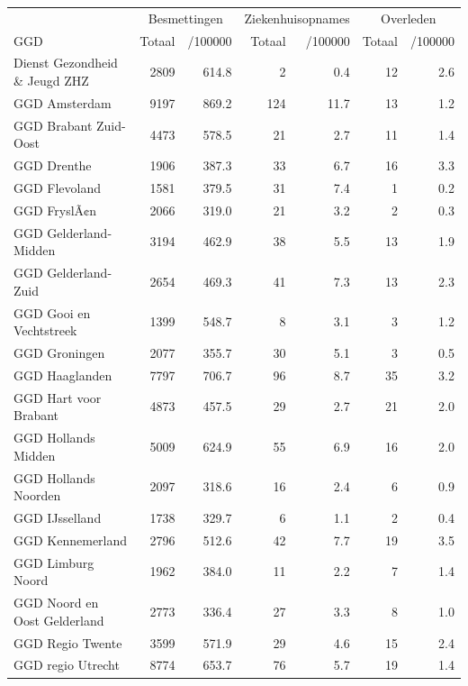 \documentclass[
  english,
  man,floatsintext]{apa6}
\begin{document}
\begin{table}[H]
\centering\begingroup\fontsize{10}{12}\selectfont

\begin{threeparttable}
\begin{tabular}{lrrrrrr}
\toprule
\multicolumn{1}{c}{ } & \multicolumn{2}{c}{Besmettingen} & \multicolumn{2}{c}{Ziekenhuisopnames} & \multicolumn{2}{c}{Overleden} \\
\cmidrule(l{3pt}r{3pt}){2-3} \cmidrule(l{3pt}r{3pt}){4-5} \cmidrule(l{3pt}r{3pt}){6-7}
GGD & Totaal & /100000 & Totaal & /100000 & Totaal & /100000\\
\midrule
Dienst Gezondheid \& Jeugd ZHZ & 2809 & 614.8 & 2 & 0.4 & 12 & 2.6\\
GGD Amsterdam & 9197 & 869.2 & 124 & 11.7 & 13 & 1.2\\
GGD Brabant Zuid-Oost & 4473 & 578.5 & 21 & 2.7 & 11 & 1.4\\
GGD Drenthe & 1906 & 387.3 & 33 & 6.7 & 16 & 3.3\\
GGD Flevoland & 1581 & 379.5 & 31 & 7.4 & 1 & 0.2\\
GGD FryslÃ¢n & 2066 & 319.0 & 21 & 3.2 & 2 & 0.3\\
GGD Gelderland-Midden & 3194 & 462.9 & 38 & 5.5 & 13 & 1.9\\
GGD Gelderland-Zuid & 2654 & 469.3 & 41 & 7.3 & 13 & 2.3\\
GGD Gooi en Vechtstreek & 1399 & 548.7 & 8 & 3.1 & 3 & 1.2\\
GGD Groningen & 2077 & 355.7 & 30 & 5.1 & 3 & 0.5\\
GGD Haaglanden & 7797 & 706.7 & 96 & 8.7 & 35 & 3.2\\
GGD Hart voor Brabant & 4873 & 457.5 & 29 & 2.7 & 21 & 2.0\\
GGD Hollands Midden & 5009 & 624.9 & 55 & 6.9 & 16 & 2.0\\
GGD Hollands Noorden & 2097 & 318.6 & 16 & 2.4 & 6 & 0.9\\
GGD IJsselland & 1738 & 329.7 & 6 & 1.1 & 2 & 0.4\\
GGD Kennemerland & 2796 & 512.6 & 42 & 7.7 & 19 & 3.5\\
GGD Limburg Noord & 1962 & 384.0 & 11 & 2.2 & 7 & 1.4\\
GGD Noord en Oost Gelderland & 2773 & 336.4 & 27 & 3.3 & 8 & 1.0\\
GGD Regio Twente & 3599 & 571.9 & 29 & 4.6 & 15 & 2.4\\
GGD regio Utrecht & 8774 & 653.7 & 76 & 5.7 & 19 & 1.4\\

\end{tabular}
\end{threeparttable}
\end{table}
\end{document}

